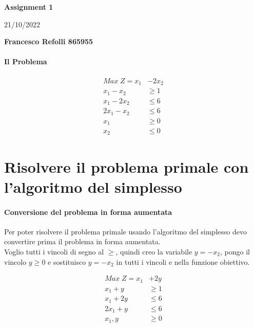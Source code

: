 \documentclass[a4paper,12pt,oneside]{article}
\begin{document}
    \thispagestyle{plain}
    \begin{center}
        \normalsize
        \textbf{Assignment 1}
            
        \vspace{0.2cm}
        \normalsize
        21/10/2022
            
        \vspace{0.2cm}
        \textbf{Francesco Refolli 865955}
    \end{center}

    \paragraph{Il Problema}
    
    \begin{align*}
        Max \; Z = x_1 &- 2 x_2 \\
        x_1 - x_2 & \geq 1 \\
        x_1 - 2 x_2 & \leq 6 \\
        2 x_1 - x_2 & \leq 6 \\
        x_1 & \geq 0 \\
        x_2 & \leq 0
    \end{align*}

    \section{Risolvere il problema primale con l’algoritmo del simplesso}

    \paragraph{Conversione del problema in forma aumentata}
    Per poter risolvere il problema primale usando l'algoritmo del simplesso devo convertire prima il problema in forma aumentata. \\
    Voglio tutti i vincoli di segno al $\geq$, quindi creo la variabile $y = - x_2$, pongo il vincolo $y \geq 0$ e sostituisco $y = -x_2$ in tutti i vincoli e nella funzione obiettivo.

    \begin{align*}
        Max \; Z = x_1 &+ 2 y \\
        x_1 + y & \geq 1 \\
        x_1 + 2 y & \leq 6 \\
        2 x_1 + y & \leq 6 \\
        x_1, y & \geq 0
    \end{align*}
\end{document}
